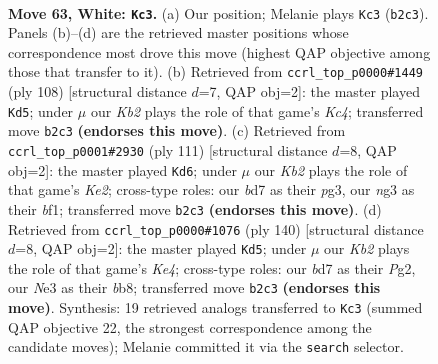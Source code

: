 \documentclass[11pt]{article}
\begin{document}
\clearpage

\begin{figure}[p]\centering
\begin{subfigure}{0.46\textwidth}\centering
\resizebox{\linewidth}{!}{%
\newchessgame
\chessboard[
  setfen={8/k2b4/8/P7/1P6/4N1n1/1K1p4/8 w - - 4 63},
  showmover=false,
  pgfstyle=straightmove, color=movearrow, markmove={b2-c3}
]}
\caption{}
\end{subfigure}\hfill
\begin{subfigure}{0.46\textwidth}\centering
\resizebox{\linewidth}{!}{%
\newchessgame
\chessboard[
  setfen={8/8/3b1k2/5P2/2K1P1p1/8/4N3/8 w - - 2 55},
  showmover=false,
  pgfstyle=straightmove, color=movearrow, markmove={c4-d5}
]}
\caption{}
\end{subfigure}
\\[4pt]
\begin{subfigure}{0.46\textwidth}\centering
\resizebox{\linewidth}{!}{%
\newchessgame
\chessboard[
  setfen={8/2n1k3/2P2p2/6p1/4K3/6P1/8/5B2 b - - 0 56},
  showmover=false,
  pgfstyle=straightmove, color=movearrow, markmove={e7-d6}
]}
\caption{}
\end{subfigure}\hfill
\begin{subfigure}{0.46\textwidth}\centering
\resizebox{\linewidth}{!}{%
\newchessgame
\chessboard[
  setfen={1b6/1P1k4/6p1/1N5p/4K3/8/6P1/8 w - - 2 71},
  showmover=false,
  pgfstyle=straightmove, color=movearrow, markmove={e4-d5}
]}
\caption{}
\end{subfigure}
\caption{\textbf{Move 63, White: \texttt{Kc3}.} (a) Our position; Melanie plays \texttt{Kc3} (\texttt{b2c3}). Panels (b)--(d) are the retrieved master positions whose correspondence most drove this move (highest QAP objective among those that transfer to it). (b) Retrieved from \texttt{ccrl\_top\_p0000\#1449} (ply 108) [structural distance $d$=7, QAP obj=2]: the master played \texttt{Kd5}; under $\mu$ our \emph{Kb2} plays the role of that game's \emph{Kc4}; transferred move \texttt{b2c3} \textbf{(endorses this move)}. (c) Retrieved from \texttt{ccrl\_top\_p0001\#2930} (ply 111) [structural distance $d$=8, QAP obj=2]: the master played \texttt{Kd6}; under $\mu$ our \emph{Kb2} plays the role of that game's \emph{Ke2}; cross-type roles: our \emph{b}d7 as their \emph{p}g3, our \emph{n}g3 as their \emph{b}f1; transferred move \texttt{b2c3} \textbf{(endorses this move)}. (d) Retrieved from \texttt{ccrl\_top\_p0000\#1076} (ply 140) [structural distance $d$=8, QAP obj=2]: the master played \texttt{Kd5}; under $\mu$ our \emph{Kb2} plays the role of that game's \emph{Ke4}; cross-type roles: our \emph{b}d7 as their \emph{P}g2, our \emph{N}e3 as their \emph{b}b8; transferred move \texttt{b2c3} \textbf{(endorses this move)}. Synthesis: 19 retrieved analogs transferred to \texttt{Kc3} (summed QAP objective 22, the strongest correspondence among the candidate moves); Melanie committed it via the \texttt{search} selector.}
\label{fig:thought-m124}
\end{figure}
\end{document}

